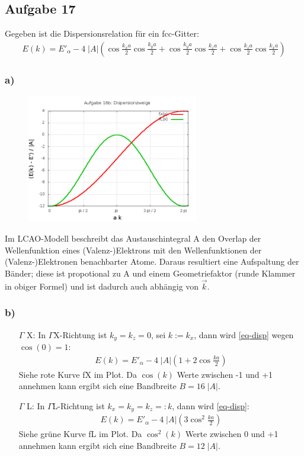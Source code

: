 \subsection*{Aufgabe 17}
Gegeben ist die Dispersionsrelation für ein fcc-Gitter:
\begin{align}
\label{eq-disp}
  E(k) = E'_\alpha - 4\;|A| \left(\cos\frac{k_x a}{2}\cos\frac{k_y a}{2} +
    \cos\frac{k_y a}{2}\cos\frac{k_z a}{2} + \cos\frac{k_z a}{2}\cos\frac{k_x a}{2} \right)
\end{align}

\subsubsection*{a)}
\begin{figure}
  \centering
  \includegraphics[width=7.5cm]{aufgabe16b.png}
\label{bild16b}
\end{figure}
Im LCAO-Modell beschreibt das Austauschintegral A den Overlap der Wellenfunktion
eines (Valenz-)Elektrons mit den Wellenfunktionen der (Valenz-)Elektronen benachbarter
Atome. Daraus resultiert eine Aufspaltung der Bänder; diese ist propotional zu A
und einem Geometriefaktor (runde Klammer in obiger Formel) und ist dadurch
auch abhängig von $\vec k$.
\newline
\subsubsection*{b)}
\begin{itemize}
\item[$\Gamma$ X:]
  In $\Gamma$X-Richtung ist $k_y = k_z = 0$, sei $k:= k_x$, dann wird \eqref{eq-disp}
  wegen $\cos(0) = 1$:
\begin{align*}
    E(k) = E'_\alpha - 4\;|A| \left(1 + 2 \cos\frac{k a}{2} \right)
\end{align*}
Siehe rote Kurve fX im Plot. Da $\cos(k)$ Werte zwischen -1 und +1 annehmen kann
ergibt sich eine Bandbreite $B = 16\;|A|$.
\item[$\Gamma$ L:]
  In $\Gamma$L-Richtung ist $k_x = k_y = k_z =: k$, dann wird \eqref{eq-disp}:
\begin{align*}
    E(k) = E'_\alpha - 4\;|A| \left(3 \cos^2\frac{k a}{2} \right)
\end{align*}
Siehe grüne Kurve fL im Plot. Da $\cos^2(k)$ Werte zwischen 0 und +1 annehmen kann
ergibt sich eine Bandbreite $B = 12\;|A|$.
\end{itemize}

